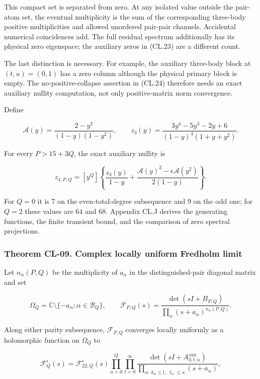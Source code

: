 \documentclass[a4paper,11pt]{article}
\numberwithin{equation}{section}
\begin{document}
This compact set is separated from zero. At any isolated value outside the pair-atom set, the eventual multiplicity is the sum of the corresponding three-body positive multiplicities and allowed unordered pair-pair channels. Accidental numerical coincidences add. The full residual spectrum additionally has its physical zero eigenspace; the auxiliary zeros in (CL.23) are a different count.

The last distinction is necessary. For example, the auxiliary three-body block at \((t,u)=(0,1)\) has a zero column although the physical primary block is empty. The no-positive-collapse assertion in (CL.24) therefore needs an exact auxiliary nullity computation, not only positive-matrix norm convergence.

Define

\[
\mathcal A(y)=\frac{2-y^2}{(1-y)(1-y^2)},\qquad
z_3(y)=\frac{3y^4-5y^3-2y+6}{(1-y)^4(1+y+y^2)}.
\]

For every \(P>15+3Q\), the exact auxiliary nullity is

\[
z_{4,P,Q}=[y^Q]\left\{
\frac{z_3(y)}{1-y}
+\frac{\mathcal A(y)^2-\epsilon\mathcal A(y^2)}{2(1-y)}
\right\}.
\tag{CL.25}
\]

For \(Q=0\) it is \(7\) on the even-total-degree subsequence and \(9\) on the odd one; for \(Q=2\) these values are \(64\) and \(68\). Appendix CL.J derives the generating functions, the finite transient bound, and the comparison of zero spectral projections.

\hypertarget{theorem-cl-09.-complex-locally-uniform-fredholm-limit}{%
\subsubsection{Theorem CL-09. Complex locally uniform Fredholm limit}\label{theorem-cl-09.-complex-locally-uniform-fredholm-limit}}

Let \(n_\alpha(P,Q)\) be the multiplicity of \(a_\alpha\) in the distinguished-pair diagonal matrix and set

\[
\Omega_Q=\mathbb C\setminus\{-a_\alpha:\alpha\in\mathcal B_Q\},
\qquad
\mathcal F_{P,Q}(s)=
\frac{\det(sI+B_{P,Q})}{\prod_\alpha(s+a_\alpha)^{n_\alpha(P,Q)}}.
\tag{CL.26}
\]

Along either parity subsequence, \(\mathcal F_{P,Q}\) converges locally uniformly as a holomorphic function on \(\Omega_Q\) to

\[
\mathcal F_Q^\epsilon(s)=
\mathcal F_{22,Q}^\epsilon(s)
\prod_{u=0}^Q\prod_{t=0}^{\infty}
\frac{\det(sI+A_{3;t,u}^{\mathrm{aux}})}
{\prod_{\alpha:\,k_\alpha\leq t,\ \ell_\alpha\leq u}(s+a_\alpha)},
\tag{CL.27}
\]
\end{document}
